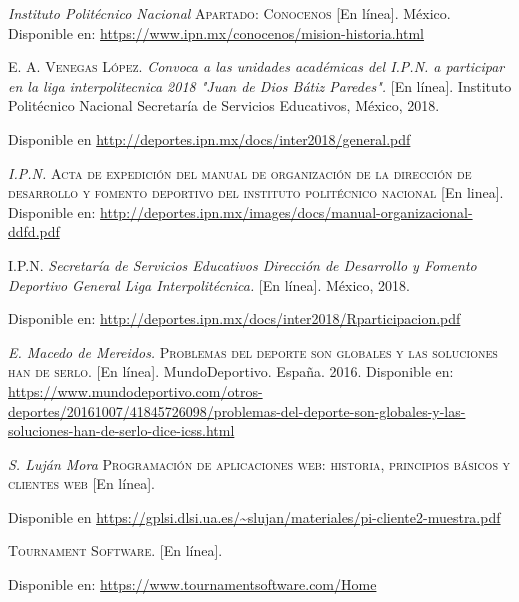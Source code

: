 \begin{thebibliography}{}
	\textit{Instituto Politécnico Nacional}
	\textsc{Apartado: Conocenos} [En línea]. México.
	Disponible en: 
	\url{https://www.ipn.mx/conocenos/mision-historia.html}
	
	\textsc{E. A. Venegas López.}
	\textit{Convoca a las unidades académicas del I.P.N. a participar en la liga interpolitecnica 2018 "Juan de Dios Bátiz Paredes".} [En línea]. Instituto Politécnico Nacional Secretaría de Servicios Educativos, México, 2018.
	
	Disponible en
	\url{http://deportes.ipn.mx/docs/inter2018/general.pdf}
	
	\textit{I.P.N.}
	\textsc{Acta de expedición del manual de organización de la dirección de desarrollo y fomento deportivo del instituto politécnico nacional} [En linea].
	Disponible en:
	\url{http://deportes.ipn.mx/images/docs/manual-organizacional-ddfd.pdf}

	\textsc{I.P.N.}
	\textit{Secretaría de Servicios Educativos Dirección de Desarrollo y Fomento Deportivo General Liga Interpolitécnica.}
	[En línea]. México, 2018.
	
	Disponible en: 
	\url{http://deportes.ipn.mx/docs/inter2018/Rparticipacion.pdf}

	\textit{E. Macedo de Mereidos.}
	\textsc{Problemas del deporte son globales y las soluciones han de serlo.} [En línea]. 
	MundoDeportivo. España. 2016.
	Disponible en: 
	\url{https://www.mundodeportivo.com/otros-deportes/20161007/41845726098/problemas-del-deporte-son-globales-y-las-soluciones-han-de-serlo-dice-icss.html}
	
	\textit{S. Luján Mora}
	\textsc{Programación de aplicaciones web: historia, principios básicos y clientes web} [En línea].
	
	Disponible en 
	\url{https://gplsi.dlsi.ua.es/~slujan/materiales/pi-cliente2-muestra.pdf}
	
	\textit{}
	\textsc{Tournament Software.} [En línea].
	
	Disponible en: 
	\url{https://www.tournamentsoftware.com/Home}
	

\end{thebibliography}
